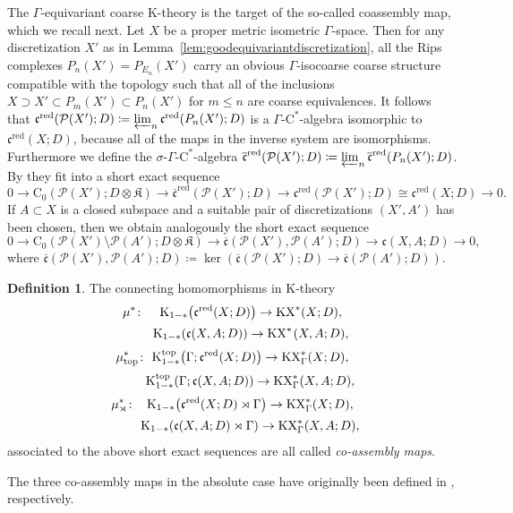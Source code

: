 \documentclass[pdftex]{sigma}
\numberwithin{equation}{section}
\theoremstyle{definition}
\newtheorem{defn}[thm]{Definition}
\newcommand{\cP}{\mathcal{P}}
\newcommand{\Ct}{\mathrm{C}}
\newcommand{\Cz}{\Ct_0}
\newcommand{\KX}{\mathrm{KX}}
\newcommand{\K}{\mathrm{K}}
\newcommand{\Ktop}{\mathrm{K}^{\mathrm{top}}}
\newcommand{\textCstar}{\ensuremath{\mathrm{C}^*\!}}
\newcommand{\sHigCom}{\overline{\mathfrak{c}}}
\newcommand{\sHigCor}{\mathfrak{c}}
\newcommand{\sHigComRed}{\overline{\mathfrak{c}}^{\mathrm{red}}}
\newcommand{\sHigCorRed}{\mathfrak{c}^{\mathrm{red}}}
\newcommand{\Kom}{{\mathfrak{K}}}
\begin{document}
The $\Gamma$-equivariant coarse $\K$-theory is the target of the so-called coassembly map, which we recall next. Let $X$ be a proper metric isometric $\Gamma$-space. Then for any discretization $X'$ as in Lemma~\ref{lem:goodequivariantdiscretization}, all the Rips complexes $P_n(X')=P_{E_n}(X')$ carry an obvious $\Gamma$-isocoarse coarse structure compatible with the topology such that all of the inclusions $X\supset X'\subset P_m(X')\subset P_n(X')$ for $m\leq n$ are coarse equivalences. It follows that $\sHigCorRed(\cP(X');D)\coloneqq\varprojlim_{n}\sHigCorRed(P_n(X');D)$
is a $\Gamma$-\textCstar-algebra isomorphic to $\sHigCorRed(X;D)$,
because all of the maps in the inverse system are isomorphisms.
Furthermore we define the $\sigma$-$\Gamma$-\textCstar-algebra
$\sHigComRed(\cP(X');D)\coloneqq\varprojlim_{n}\sHigComRed(P_n(X');D)$.
By \cite{EmeMeyDualizing} they fit into a short exact sequence
\[
0\to\Cz(\cP(X');D\otimes\Kom)\to\sHigComRed(\cP(X');D)\to\sHigCorRed(\cP(X');D)\cong\sHigCorRed(X;D)\to 0.
\]
If $A\subset X$ is a closed subspace and a suitable pair of discretizations $(X',A')$ has been chosen, then we obtain analogously the short exact sequence
\[
0\to\Cz(\cP(X')\setminus\cP(A');D\otimes\Kom)\to\sHigCom(\cP(X'),\cP(A');D)\to\sHigCor(X,A;D)\to 0,
\]
where $\sHigCom(\cP(X'),\cP(A');D)\coloneqq\ker(\sHigCom(\cP(X');D)\to\sHigCom(\cP(A');D))$.

\begin{defn}
The connecting homomorphisms in $\K$-theory
\begin{gather*}
\mu^*\colon\quad\, \K_{1-*}\big(\sHigCorRed(X;D)\big)\to\KX^*(X;D),
\\[.5ex]
\hphantom{\mu^*\colon\quad\,}\K_{1-*}(\sHigCor(X,A;D))\to\KX_{\phantom{\Gamma}}^*(X,A;D),
\\[.5ex]
\mu_{\mathrm{top}}^*\colon\ \Ktop_{1-*}\big(\Gamma;\sHigCorRed(X;D)\big)\to\KX_\Gamma^*(X;D),
\\[.5ex]
\hphantom{\mu_{\mathrm{top}}^*\colon\ }\Ktop_{1-*}(\Gamma;\sHigCor(X,A;D))\to\KX_\Gamma^*(X,A;D),
\\[.5ex]
\mu_\rtimes^*\colon \ \ \,\K_{1-*}\big(\sHigCorRed(X;D)\rtimes\Gamma\big)\to\KX_\Gamma^*(X;D),
\\[.5ex]
\hphantom{\mu_\rtimes^*\colon\ \ \, }\K_{1-*}(\sHigCor(X,A;D)\rtimes\Gamma)\to\KX_\Gamma^*(X,A;D),
\end{gather*}
associated to the above short exact sequences are all called \emph{co-assembly maps}.
\end{defn}
The three co-assembly maps in the absolute case have originally been defined in \cite{EmeMeyDualizing,EmeMeyDescent,EngelWulffZeidler}, respectively.
\end{document}
